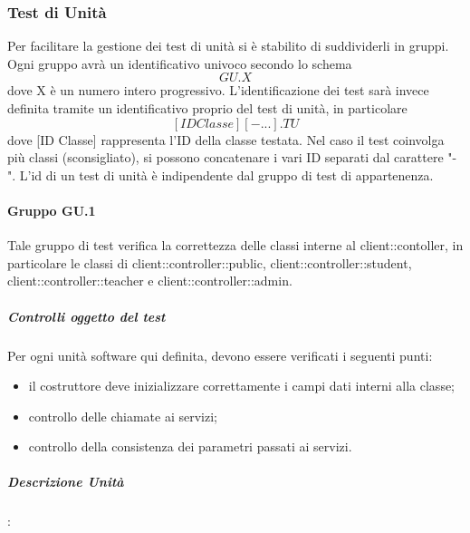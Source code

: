 \documentclass[12pt,a4paper]{article}
\begin{document}
\subsubsection{Test di Unità}\label{test_unita}
Per facilitare la gestione dei test di unità si è stabilito di suddividerli in gruppi. Ogni gruppo avrà un identificativo univoco secondo lo schema
\[ GU.X  \]
dove X è un numero intero progressivo. 
L'identificazione dei test sarà invece definita tramite un identificativo proprio del test di unità, in particolare
\[ [ID Classe][- ...].TU \] 
dove [ID Classe] rappresenta l'ID della classe testata. Nel caso il test coinvolga più classi (sconsigliato), si possono concatenare i vari ID separati dal carattere "-".
L'id di un test di unità è indipendente dal gruppo di test di appartenenza.
\paragraph{Gruppo GU.1}
Tale gruppo di test verifica la correttezza delle classi interne al  client::contoller, in particolare le classi di client::controller::public, client::controller::student, client::controller::teacher e client::controller::admin.
\subparagraph{Controlli oggetto del test}
Per ogni unità software qui definita, devono essere verificati i seguenti punti:
\begin{itemize}
	\item il costruttore deve inizializzare correttamente i campi dati interni alla classe;
	\item controllo delle chiamate ai servizi;
	\item controllo della consistenza dei parametri passati ai servizi.
\end{itemize}
\subparagraph{Descrizione Unità}:
\end{document}
